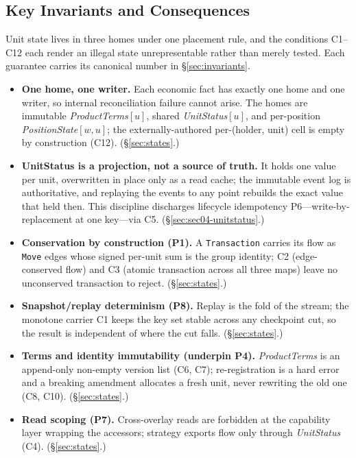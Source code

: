 \subsection*{Key Invariants and Consequences}

Unit state lives in three homes under one placement rule, and the conditions C1--C12 each
render an illegal state unrepresentable rather than merely tested. Each guarantee carries
its canonical number in \S\ref{sec:invariants}.

\begin{itemize}[nosep]
\item \textbf{One home, one writer.} Each economic fact has exactly one home and one
writer, so internal reconciliation failure cannot arise. The homes are immutable
\emph{ProductTerms}$[u]$, shared \emph{UnitStatus}$[u]$, and per-position
\emph{PositionState}$[w,u]$; the externally-authored per-(holder, unit) cell is empty by
construction (C12). (\S\ref{sec:states}.)
\item \textbf{UnitStatus is a projection, not a source of truth.} It holds one value per
unit, overwritten in place only as a read cache; the immutable event log is authoritative,
and replaying the events to any point rebuilds the exact value that held then. This
discipline discharges lifecycle idempotency P6---write-by-replacement at one key---via C5.
(\S\ref{sec:sec04-unitstatus}.)
\item \textbf{Conservation by construction (P1).} A \texttt{Transaction} carries its flow
as \texttt{Move} edges whose signed per-unit sum is the group identity; C2 (edge-conserved
flow) and C3 (atomic transaction across all three maps) leave no unconserved transaction
to reject. (\S\ref{sec:states}.)
\item \textbf{Snapshot/replay determinism (P8).} Replay is the fold of the stream; the
monotone carrier C1 keeps the key set stable across any checkpoint cut, so the result is
independent of where the cut falls. (\S\ref{sec:states}.)
\item \textbf{Terms and identity immutability (underpin P4).} \emph{ProductTerms} is an
append-only non-empty version list (C6, C7); re-registration is a hard error and a breaking
amendment allocates a fresh unit, never rewriting the old one (C8, C10).
(\S\ref{sec:states}.)
\item \textbf{Read scoping (P7).} Cross-overlay reads are forbidden at the capability layer
wrapping the accessors; strategy exports flow only through \emph{UnitStatus} (C4).
(\S\ref{sec:states}.)
\end{itemize}
